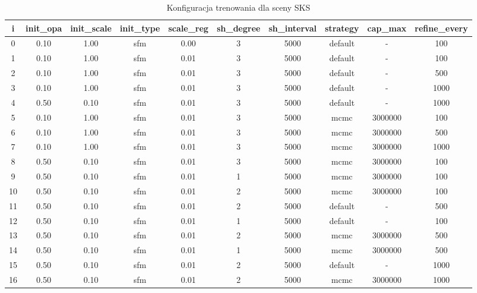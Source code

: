 \begin{table}[!h]
    \centering
    \begin{tabular}{|c|c|c|c|c|c|c|c|c|c|}
    \hline
    i & init\_opa & init\_scale & init\_type & scale\_reg & sh\_degree & sh\_interval & strategy & cap\_max & refine\_every \\
    \hline
    0 & 0.10 & 1.00 & sfm & 0.00 & 3 & 5000 & default & - & 100 \\
    \hline
    1 & 0.10 & 1.00 & sfm & 0.01 & 3 & 5000 & default & - & 100 \\
    \hline
    2 & 0.10 & 1.00 & sfm & 0.01 & 3 & 5000 & default & - & 500 \\
    \hline
    3 & 0.10 & 1.00 & sfm & 0.01 & 3 & 5000 & default & - & 1000 \\
    \hline
    4 & 0.50 & 0.10 & sfm & 0.01 & 3 & 5000 & default & - & 1000 \\
    \hline
    5 & 0.10 & 1.00 & sfm & 0.01 & 3 & 5000 & mcmc & 3000000 & 100 \\
    \hline
    6 & 0.10 & 1.00 & sfm & 0.01 & 3 & 5000 & mcmc & 3000000 & 500 \\
    \hline
    7 & 0.10 & 1.00 & sfm & 0.01 & 3 & 5000 & mcmc & 3000000 & 1000 \\
    \hline
    8 & 0.50 & 0.10 & sfm & 0.01 & 3 & 5000 & mcmc & 3000000 & 100 \\
    \hline
    9 & 0.50 & 0.10 & sfm & 0.01 & 1 & 5000 & mcmc & 3000000 & 100 \\
    \hline
    10 & 0.50 & 0.10 & sfm & 0.01 & 2 & 5000 & mcmc & 3000000 & 100 \\
    \hline
    11 & 0.50 & 0.10 & sfm & 0.01 & 2 & 5000 & default & - & 500 \\
    \hline
    12 & 0.50 & 0.10 & sfm & 0.01 & 1 & 5000 & default & - & 100 \\
    \hline
    13 & 0.50 & 0.10 & sfm & 0.01 & 2 & 5000 & mcmc & 3000000 & 500 \\
    \hline
    14 & 0.50 & 0.10 & sfm & 0.01 & 1 & 5000 & mcmc & 3000000 & 500 \\
    \hline
    15 & 0.50 & 0.10 & sfm & 0.01 & 2 & 5000 & default & - & 1000 \\  
    \hline
    16 & 0.50 & 0.10 & sfm & 0.01 & 2 & 5000 & mcmc & 3000000 & 1000 \\
    \hline
    \end{tabular}
    \caption{Konfiguracja trenowania dla sceny SKS}
    \label{table:tab_conf_sks}
\end{table}


